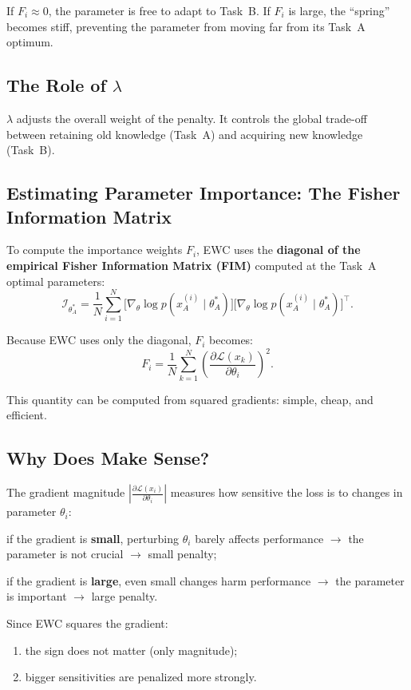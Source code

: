 If $F_i \approx 0$, the parameter is free to adapt to Task~B. If $F_i$ is large, the ``spring''
becomes stiff, preventing the parameter from moving far from its Task~A optimum.

\subsection{The Role of $\lambda$}
$\lambda$ adjusts the overall weight of the penalty. It controls the global trade-off between
retaining old knowledge (Task~A) and acquiring new knowledge (Task~B).

\subsection{Estimating Parameter Importance: The Fisher Information Matrix}
To compute the importance weights $F_i$, EWC uses the \textbf{diagonal of the empirical Fisher
Information Matrix (FIM)} computed at the Task~A optimal parameters:
\[
\mathcal{I}_{\theta_A^*}
=
\frac{1}{N}
\sum_{i=1}^{N}
\bigl[
\nabla_\theta \log p(x_A^{(i)} \mid \theta_A^*)
\bigr]
\bigl[
\nabla_\theta \log p(x_A^{(i)} \mid \theta_A^*)
\bigr]^{\top}.
\]

Because EWC uses only the diagonal, $F_i$ becomes:
\[
F_i
=
\frac{1}{N}
\sum_{k=1}^{N}
\left(
\frac{\partial \mathcal{L}(x_k)}{\partial \theta_i}
\right)^2.
\]

This quantity can be computed from squared gradients: simple, cheap, and efficient.

\subsection{Why Does Make Sense?}
The gradient magnitude $\left|\frac{\partial \mathcal{L}(x_i)}{\partial \theta_i}\right|$ measures how
sensitive the loss is to changes in parameter $\theta_i$:
\begin{compactitemize}
    \item if the gradient is \textbf{small}, perturbing $\theta_i$ barely affects performance
    $\rightarrow$ the parameter is not crucial $\rightarrow$ small penalty;
    \item if the gradient is \textbf{large}, even small changes harm performance
    $\rightarrow$ the parameter is important $\rightarrow$ large penalty.
\end{compactitemize}

Since EWC squares the gradient:
\begin{enumerate}
    \item the sign does not matter (only magnitude);
    \item bigger sensitivities are penalized more strongly.
\end{enumerate}

